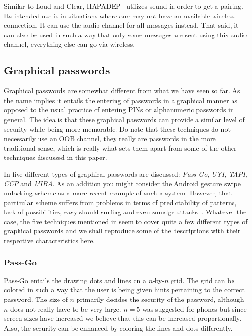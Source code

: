 \documentclass[conference, 12pt]{sty/IEEEtran}
\begin{document}
Similar to Loud-and-Clear, HAPADEP~\cite{soriente2008hapadep} utilizes sound in order to get a pairing.
Its intended use is in situations where one may not have an available wireless connection.
It can use the audio channel for all messages instead.
That said, it can also be used in such a way that only some messages are sent using this audio channel, everything else can go via wireless.


\subsection{Graphical passwords}
\label{ssec:graphical_passwords}

Graphical passwords are somewhat different from what we have seen so far.
As the name implies it entails the entering of passwords in a graphical manner as opposed to the usual practice of entering PINs or alphanumeric passwords in general.
The idea is that these graphical passwords can provide a similar level of security while being more memorable.
Do note that these techniques do not necessarily use an OOB channel, they really are passwords in the more traditional sense, which is really what sets them apart from some of the other techniques discussed in this paper.

In \cite{gajos2006exploring} five different types of graphical passwords are discussed: \emph{Pass-Go}, \emph{UYI}, \emph{TAPI}, \emph{CCP} and \emph{MIBA}.
As an addition you might consider the Android gesture swipe unlocking scheme as a more recent example of such a system.
However, that particular scheme suffers from problems in terms of predictability of patterns, lack of possibilities, easy should surfing and even smudge attacks~\cite{aviv2010smudge}.
Whatever the case, the five techniques mentioned in \cite{gajos2006exploring} seem to cover quite a few different types of graphical passwords and we shall reproduce some of the descriptions with their respective characteristics here.

\subsubsection{Pass-Go}
\label{sssec:pass_go}

Pass-Go entails the drawing dots and lines on a $n$-by-$n$ grid.
The grid can be colored in such a way that the user is being given hints pertaining to the correct password.
The size of $n$ primarily decides the security of the password, although $n$ does not really have to be very large.
$n = 5$ was suggested for phones but since screen sizes have increased we believe that this can be increased proportionally.
Also, the security can be enhanced by coloring the lines and dots differently.
\end{document}
